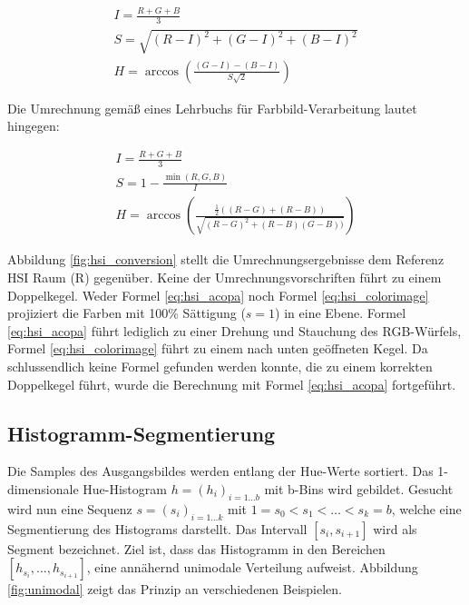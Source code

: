 \documentclass[11pt,a4paper,bibliography=totoc,twocolumn]{scrartcl}
\begin{document}
\begin{equation}
\begin{split}
I = \frac{R+G+B}{3} \\
S = \sqrt{(R-I)^2 + (G-I)^2 + (B-I)^2} \\  
H = \arccos{(\frac{(G-I)-(B-I)}{S\sqrt{2}})}
\end{split}
\label{eq:hsi_acopa}
\end{equation}

Die Umrechnung gemäß eines Lehrbuchs für Farbbild-Verarbeitung \citep{colorimage} lautet hingegen:

\begin{equation}
\begin{split}
I = \frac{R+G+B}{3} \\
S = 1 - \frac{\min{(R, G, B)}}{I} \\ 
H = \arccos{(\frac{\frac{1}{2}((R-G)+(R-B))}{\sqrt{(R-G)^2+(R-B)(G-B))}})}
\end{split}
\label{eq:hsi_colorimage}
\end{equation}

Abbildung \ref{fig:hsi_conversion} stellt die Umrechnungsergebnisse dem Referenz HSI Raum (R) gegenüber. Keine der Umrechnungsvorschriften führt zu einem Doppelkegel. Weder Formel \ref{eq:hsi_acopa} noch Formel \ref{eq:hsi_colorimage} projiziert die Farben mit 100\% Sättigung ($s = 1$) in eine Ebene. Formel \ref{eq:hsi_acopa} führt lediglich zu einer Drehung und Stauchung des RGB-Würfels, Formel \ref{eq:hsi_colorimage} führt zu einem nach unten geöffneten Kegel. Da schlussendlich keine Formel gefunden werden konnte, die zu einem korrekten Doppelkegel führt, wurde die Berechnung mit Formel \ref{eq:hsi_acopa} fortgeführt.

\subsection{Histogramm-Segmentierung}

Die Samples des Ausgangsbildes werden entlang der Hue-Werte sortiert. Das 1-dimensionale Hue-Histogram $h=(h_i)_{i = 1 \ldots b}$ mit b-Bins wird gebildet. Gesucht wird nun eine Sequenz $s = (s_i)_{i = 1 \ldots k}$ mit $1 = s_0 < s_1 < \ldots < s_k = b$, welche eine Segmentierung des Histograms darstellt. Das Intervall $[{s_i}, s_{i+1}]$ wird als Segment bezeichnet. Ziel ist, dass das Histogramm in den Bereichen $[h_{s_i}, \ldots,  h_{s_{i+1}}]$, eine \glqq annähernd unimodale Verteilung aufweist\grqq \citep{acopa}. Abbildung \ref{fig:unimodal} zeigt das Prinzip an verschiedenen Beispielen.
\end{document}
